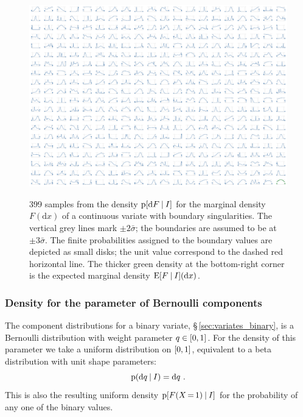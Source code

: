 \documentclass[\ifafour a4paper,12pt,\else a5paper,10pt,\fi%
onecolumn,oneside,article,%
british%
]{memoir}
\theoremstyle{remark}
\theoremstyle{innote}
\newcommand*{\di}{\mathrm{d}}%
\DeclarePairedDelimiter\clcl{[}{]}
\newcommand*{\p}{\mathrm{p}}%
\newcommand*{\E}{\mathrm{E}}
\renewcommand*{\|}[1][]{\nonscript\:#1\vert\nonscript\:\mathopen{}}
\newcommand*{\mo}[1][=]{\mathord{\,#1\,}}
\newcommand*{\sect}{\S}%
\newcommand*{\sigmao}{\bar{\sigma}}
\begin{document}
\begin{figure}
\centering\includegraphics[width=\linewidth]{priorsamples_2censored.pdf}\\
\caption{399 samples from the density $\p[\di F \| I]$ for the marginal density $F(\di x)$ of a continuous variate with boundary singularities. The vertical grey lines mark $\pm 2\sigmao$; the boundaries are assumed to be at $\pm 3\sigmao$. The finite probabilities assigned to the boundary values are depicted as small disks; the unit value correspond to the dashed red horizontal line. The thicker green density at the bottom-right corner is the expected marginal density $\E[F\| I](\di x)$.}\label{fig:marginal_real}
\end{figure}

\subsubsection{Density for the parameter of Bernoulli components}
\label{sec:density_bernoulli}

The component distributions for a binary variate, \sect\,\ref{sec:variates_binary}, is a Bernoulli distribution with weight parameter $q \in\clcl{0,1}$. For the density of this parameter we take a uniform distribution on $\clcl{0,1}$, equivalent to a beta distribution with unit shape parameters:
\begin{equation}
  \label{eq:density_q_bernoulli}
  \p(\di q\|I) = \di q \ .
\end{equation}
This is also the resulting uniform density $\p[F(X \mo 1) \|I]$ for the probability of any one of the binary values.
\end{document}
